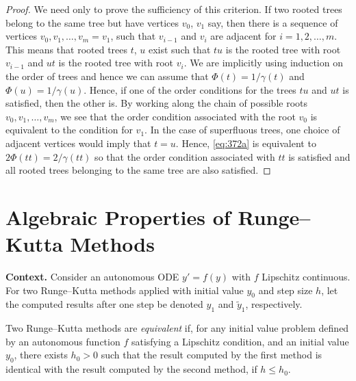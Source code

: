 \begin{proof}
We need only to prove the sufficiency of this criterion. If two rooted trees belong to the same tree but have vertices $v_0$, $v_1$ say, then there is a sequence of vertices $v_0, v_1, \dots, v_m = v_1$, such that $v_{i-1}$ and $v_i$ are adjacent for $i = 1, 2, \dots, m$. This means that rooted trees $t$, $u$ exist such that $tu$ is the rooted tree with root $v_{i-1}$ and $ut$ is the rooted tree with root $v_i$. We are implicitly using induction on the order of trees and hence we can assume that $\Phi(t) = 1/\gamma(t)$ and $\Phi(u) = 1/\gamma(u)$. Hence, if one of the order conditions for the trees $tu$ and $ut$ is satisfied, then the other is. By working along the chain of possible roots $v_0, v_1, \dots, v_m$, we see that the order condition associated with the root $v_0$ is equivalent to the condition for $v_1$. In the case of superfluous trees, one choice of adjacent vertices would imply that $t = u$. Hence, \eqref{eq:372a} is equivalent to $2\Phi(tt) = 2/\gamma(tt)$ so that the order condition associated with $tt$ is satisfied and all rooted trees belonging to the same tree are also satisfied.
\end{proof}

\section{Algebraic Properties of Runge–Kutta Methods}

\noindent\textbf{Context.}
Consider an autonomous ODE $y' = f(y)$ with $f$ Lipschitz continuous. For two Runge--Kutta methods applied with initial value $y_0$ and step size $h$, let the computed results after one step be denoted $y_1$ and $\tilde y_1$, respectively.

\begin{definition}[equivalent (381A)]

  \label{def:381A}
Two Runge--Kutta methods are \emph{equivalent} if, for any initial value problem defined by an autonomous function $f$ satisfying a Lipschitz condition, and an initial value $y_0$, there exists $h_0 > 0$ such that the result computed by the first method is identical with the result computed by the second method, if $h \leq h_0$.
\end{definition}

